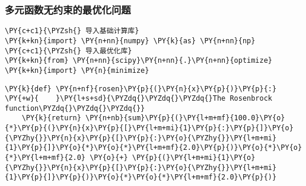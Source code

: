     \hypertarget{ux591aux5143ux51fdux6570ux65e0ux7ea6ux675fux7684ux6700ux4f18ux5316ux95eeux9898}{%
\subsubsection{多元函数无约束的最优化问题}\label{ux591aux5143ux51fdux6570ux65e0ux7ea6ux675fux7684ux6700ux4f18ux5316ux95eeux9898}}

    \begin{tcolorbox}[breakable, size=fbox, boxrule=1pt, pad at break*=1mm,colback=cellbackground, colframe=cellborder]
\begin{Verbatim}[commandchars=\\\{\}]
\PY{c+c1}{\PYZsh{} 导入基础计算库}
\PY{k+kn}{import} \PY{n+nn}{numpy} \PY{k}{as} \PY{n+nn}{np}
\PY{c+c1}{\PYZsh{} 导入最优化库}
\PY{k+kn}{from} \PY{n+nn}{scipy}\PY{n+nn}{.}\PY{n+nn}{optimize} \PY{k+kn}{import} \PY{n}{minimize}
\end{Verbatim}
\end{tcolorbox}

    \begin{tcolorbox}[breakable, size=fbox, boxrule=1pt, pad at break*=1mm,colback=cellbackground, colframe=cellborder]
\begin{Verbatim}[commandchars=\\\{\}]
\PY{k}{def} \PY{n+nf}{rosen}\PY{p}{(}\PY{n}{x}\PY{p}{)}\PY{p}{:}
\PY{+w}{    }\PY{l+s+sd}{\PYZdq{}\PYZdq{}\PYZdq{}The Rosenbrock function\PYZdq{}\PYZdq{}\PYZdq{}}
    \PY{k}{return} \PY{n+nb}{sum}\PY{p}{(}\PY{l+m+mf}{100.0}\PY{o}{*}\PY{p}{(}\PY{n}{x}\PY{p}{[}\PY{l+m+mi}{1}\PY{p}{:}\PY{p}{]}\PY{o}{\PYZhy{}}\PY{n}{x}\PY{p}{[}\PY{p}{:}\PY{o}{\PYZhy{}}\PY{l+m+mi}{1}\PY{p}{]}\PY{o}{*}\PY{o}{*}\PY{l+m+mf}{2.0}\PY{p}{)}\PY{o}{*}\PY{o}{*}\PY{l+m+mf}{2.0} \PY{o}{+} \PY{p}{(}\PY{l+m+mi}{1}\PY{o}{\PYZhy{}}\PY{n}{x}\PY{p}{[}\PY{p}{:}\PY{o}{\PYZhy{}}\PY{l+m+mi}{1}\PY{p}{]}\PY{p}{)}\PY{o}{*}\PY{o}{*}\PY{l+m+mf}{2.0}\PY{p}{)}
\end{Verbatim}
\end{tcolorbox}

